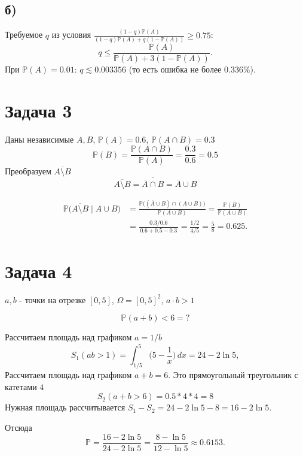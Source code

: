 \documentclass[12pt]{article}
\newcommand{\PP}{\mathbb{P}}
\begin{document}
    \subsection*{б)}
    Требуемое $q$ из условия $\displaystyle \frac{(1-q)\PP(A)}{(1-q)\PP(A)+q(1-\PP(A))}\ge 0.75$:
    \[
        q\le \frac{\PP(A)}{\PP(A)+3(1-\PP(A))}.
    \]
    При $\PP(A)=0.01$: $q\lesssim 0.003356$ (то есть ошибка не более $0.336\%$).


    \section*{Задача 3}
    Даны независимые $A,B$, $\PP(A)=0.6$, $\PP(A\cap B)=0.3$
    \[
        \PP(B)=\frac{\PP(A\cap B)}{\PP(A)}=\frac{0.3}{0.6}=0.5
    \]
    Преобразуем $\overline{A\setminus B}$
    \[
        \overline{A\setminus B}=\overline{\overline{A}\cap B}=\overline{A}\cup B
    \]

    \begin{align*}
        \PP\!\big(\overline{A\setminus B}\mid A\cup B\big)
        &=\frac{\PP\big((\overline A\cup B)\cap(A\cup B)\big)}{\PP(A\cup B)}
        =\frac{\PP(B)}{\PP(A\cup B)}\\
        &=\frac{0.3/0.6}{\,0.6+0.5-0.3\,}=\frac{1/2}{4/5}=\frac{5}{8}=0.625.
    \end{align*}


    \section*{Задача 4}
    $a,b$ - точки на отрезке $[0,5]$, $\Omega = [0,5]^2$, $a\cdot b> 1$

    \[
        \PP(a + b)<6 = ?
    \]

    Рассчитаем площадь над графиком $a=1/b$
    \[
        S_1(ab>1)=\int_{1/5}^{5}\!\Big(5-\frac1x\Big)\,dx=24-2\ln5,
    \]
        {Рассчитаем площадь над графиком $a+b=6$. Это прямоугольный треугольник с катетами $4$}
    \[
        S_2(a+b>6) =0.5 * 4*4 = 8
    \]
    Нужная площадь рассчитывается $S_1 - S_2 = 24-2\ln5 - 8 = 16 - 2\ln5$.

    Отсюда
    \[
        \PP=\frac{16-2\ln5}{24-2\ln5}=\frac{8-\ln5}{12-\ln5}\approx 0.6153.
    \]
\end{document}
